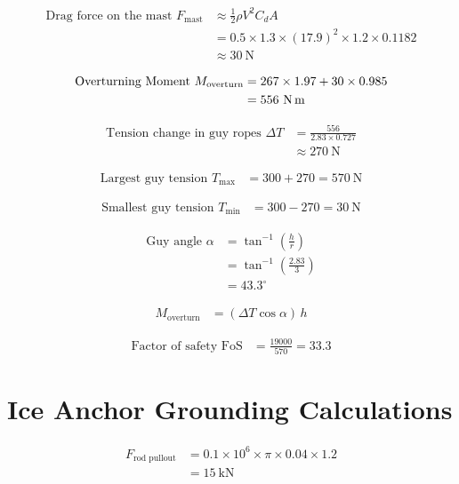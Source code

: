 \documentclass[11pt,a4paper]{article}
\begin{document}
\begin{align}
\text{Drag force on the mast }
F_{\text{mast}} &\approx \frac{1}{2} \rho V^2 C_d A \\
&= 0.5 \times 1.3 \times (17.9)^2 \times 1.2 \times 0.1182 \\
&\approx 30 \ \text{N}
\end{align}

\begin{align}
\text{Overturning Moment }
M_{\text{overturn}} &= 267 \times 1.97 + 30 \times 0.985 \\
&= 556 \ \text{N\,m}
\end{align}

\begin{align}
\text{Tension change in guy ropes }
\Delta T &= \frac{556}{2.83 \times 0.727} \\
&\approx 270 \ \text{N}
\end{align}

\begin{align}
\text{Largest guy tension }
T_{\text{max}} &= 300 + 270 = 570 \ \text{N}
\end{align}

\begin{align}
\text{Smallest guy tension }
T_{\text{min}} &= 300 - 270 = 30 \ \text{N}
\end{align}

\begin{align}
\text{Guy angle }
\alpha &= \tan^{-1}\left(\frac{h}{r}\right) \\
&= \tan^{-1}\left(\frac{2.83}{3}\right) \\
&= 43.3^\circ
\end{align}

\begin{align}
M_{\text{overturn}} &= (\Delta T \cos \alpha)\, h
\end{align}

\begin{align}
\text{Factor of safety }
\text{FoS} &= \frac{19000}{570} = 33.3
\end{align}



\section{Ice Anchor Grounding Calculations
}

\begin{align}
F_{\text{rod pullout}} &= 0.1 \times 10^6 \times \pi \times 0.04 \times 1.2 \\
&= 15 \ \text{kN}
\end{align}
\end{document}
